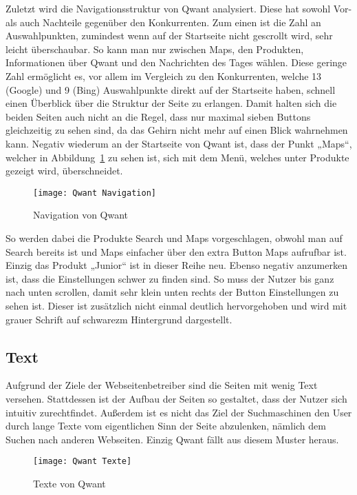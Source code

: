 Zuletzt wird die Navigationsstruktur von Qwant analysiert.
Diese hat sowohl Vor- als auch Nachteile gegenüber den Konkurrenten.
Zum einen ist die Zahl an Auswahlpunkten, zumindest wenn auf der Startseite nicht gescrollt wird, sehr leicht überschaubar.
So kann man nur zwischen Maps, den Produkten, Informationen über Qwant und den Nachrichten des Tages wählen.
Diese geringe Zahl ermöglicht es, vor allem im Vergleich zu den Konkurrenten,
welche 13 (Google) und 9 (Bing) Auswahlpunkte direkt auf der
Startseite haben, schnell einen Überblick über die Struktur der Seite zu erlangen.
Damit halten sich die beiden Seiten auch nicht an die Regel,
dass nur maximal sieben Buttons gleichzeitig zu sehen sind, da das Gehirn nicht mehr auf einen Blick
wahrnehmen kann\autocite[Seite 16]{Maulhardt.20220621b}.
Negativ wiederum an der Startseite von Qwant ist, dass der Punkt „Maps“, welcher
in Abbildung~\ref{fig:qwantnavigation} zu sehen ist, sich mit dem Menü, welches unter Produkte gezeigt wird, überschneidet.
\begin{figure}[h]
    \centering
    \texttt{[image: Qwant Navigation]}
    \caption{Navigation von Qwant}
    \label{fig:qwantnavigation}
\end{figure}

So werden dabei die
Produkte Search und Maps vorgeschlagen, obwohl man auf Search bereits ist und Maps einfacher über den extra Button Maps aufrufbar ist.
Einzig das Produkt „Junior“ ist in dieser Reihe neu.
Ebenso negativ anzumerken ist, dass die Einstellungen schwer zu finden sind.
So muss der Nutzer bis ganz nach unten scrollen, damit sehr klein unten rechts der Button Einstellungen zu sehen ist.
Dieser ist zusätzlich nicht einmal deutlich hervorgehoben und wird mit grauer Schrift auf schwarezm Hintergrund dargestellt.

\subsection{Text}
Aufgrund der Ziele der Webseitenbetreiber sind die Seiten mit wenig Text versehen. Stattdessen ist der Aufbau der Seiten
so gestaltet, dass der Nutzer sich intuitiv zurechtfindet. Außerdem ist es nicht das Ziel der Suchmaschinen den User durch
lange Texte vom eigentlichen Sinn der Seite abzulenken, nämlich dem Suchen nach anderen Webseiten. Einzig Qwant fällt aus
diesem Muster heraus.
\begin{figure}[ht]
    \centering
    \texttt{[image: Qwant Texte]}
    \caption{Texte von Qwant}\label{fig:figure9}
\end{figure}

